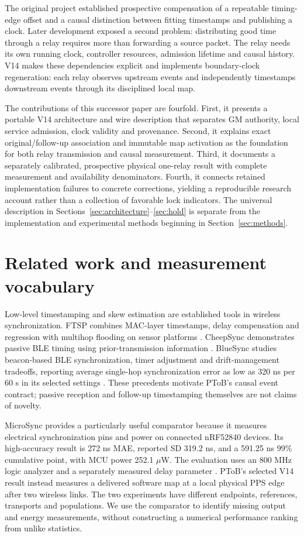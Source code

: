 \documentclass[11pt,letterpaper]{article}
\begin{document}
The original project established prospective compensation of a repeatable timing-edge offset and a causal distinction between fitting timestamps and publishing a clock. Later development exposed a second problem: distributing good time through a relay requires more than forwarding a source packet. The relay needs its own running clock, controller resources, admission lifetime and causal history. V14 makes these dependencies explicit and implements boundary-clock regeneration: each relay observes upstream events and independently timestamps downstream events through its disciplined local map.

The contributions of this successor paper are fourfold. First, it presents a portable V14 architecture and wire description that separates GM authority, local service admission, clock validity and provenance. Second, it explains exact original/follow-up association and immutable map activation as the foundation for both relay transmission and causal measurement. Third, it documents a separately calibrated, prospective physical one-relay result with complete measurement and availability denominators. Fourth, it connects retained implementation failures to concrete corrections, yielding a reproducible research account rather than a collection of favorable lock indicators. The universal description in Sections~\ref{sec:architecture}--\ref{sec:hold} is separate from the implementation and experimental methods beginning in Section~\ref{sec:methods}.

\section{Related work and measurement vocabulary}
Low-level timestamping and skew estimation are established tools in wireless synchronization. FTSP combines MAC-layer timestamps, delay compensation and regression with multihop flooding on sensor platforms \cite{ftsp}. CheepSync demonstrates passive BLE timing using prior-transmission information \cite{cheep}. BlueSync studies beacon-based BLE synchronization, timer adjustment and drift-management tradeoffs, reporting average single-hop synchronization error as low as 320 ns per 60 s in its selected settings \cite{blue}. These precedents motivate PToB's causal event contract; passive reception and follow-up timestamping themselves are not claims of novelty.

MicroSync provides a particularly useful comparator because it measures electrical synchronization pins and power on connected nRF52840 devices. Its high-accuracy result is 272 ns MAE, reported SD 319.2 ns, and a 591.25 ns 99\% cumulative point, with MCU power 252.1 $\mu$W. The evaluation uses an 800 MHz logic analyzer and a separately measured delay parameter \cite{micro}. PToB's selected V14 result instead measures a delivered software map at a local physical PPS edge after two wireless links. The two experiments have different endpoints, references, transports and populations. We use the comparator to identify missing output and energy measurements, without constructing a numerical performance ranking from unlike statistics.
\end{document}
